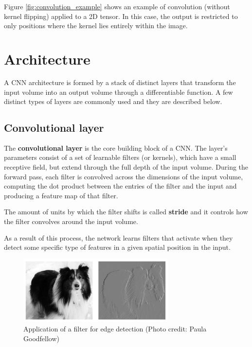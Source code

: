 Figure \ref{fig:convolution_example} shows an example of convolution (without kernel flipping) applied to a 2D tensor. In this case, the output is restricted to only positions where the kernel lies entirely within the image.

\section{Architecture}

A \acs{CNN} architecture is formed by a stack of distinct layers that transform the input volume into an output volume through a differentiable function. A few distinct types of layers are commonly used and they are described below.

\subsection{Convolutional layer}

The \textbf{convolutional layer} is the core building block of a \acs{CNN}. The layer's parameters consist of a set of learnable filters (or kernels), which have a small receptive field, but extend through the full depth of the input volume. During the forward pass, each filter is convolved across the dimensions of the input volume, computing the dot product between the entries of the filter and the input and producing a feature map of that filter.

The amount of units by which the filter shifts is called \textbf{stride} and it controls how the filter convolves around the input volume.

As a result of this process, the network learns filters that activate when they detect some specific type of features in a given spatial position in the input.

\begin{figure}
	\centering
	\includegraphics[width=0.7\textwidth]{Images/filter_application}
	\caption{Application of a filter for edge detection (Photo credit: Paula
		Goodfellow)}\label{fig:filter_application}
\end{figure}

